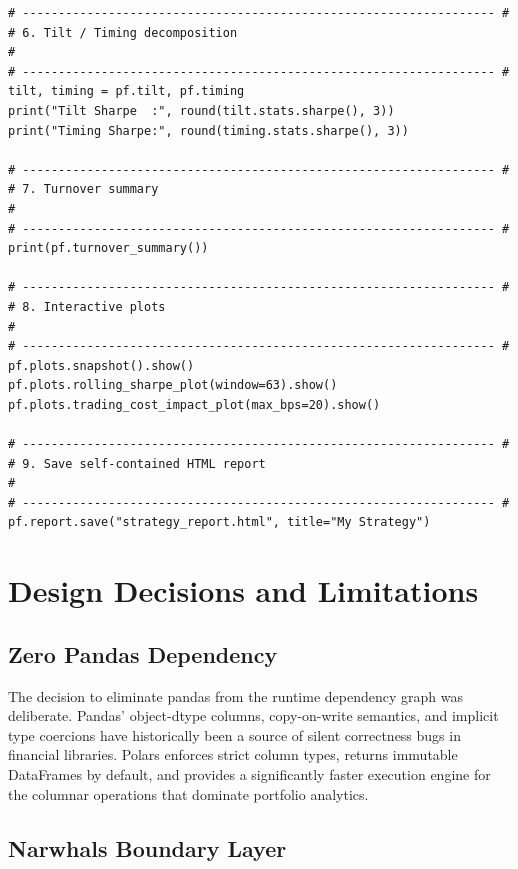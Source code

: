 \documentclass[11pt,a4paper]{article}
\begin{document}
\begin{lstlisting}[caption={Complete usage example.}]
# ------------------------------------------------------------------ #
# 6. Tilt / Timing decomposition                                      #
# ------------------------------------------------------------------ #
tilt, timing = pf.tilt, pf.timing
print("Tilt Sharpe  :", round(tilt.stats.sharpe(), 3))
print("Timing Sharpe:", round(timing.stats.sharpe(), 3))

# ------------------------------------------------------------------ #
# 7. Turnover summary                                                 #
# ------------------------------------------------------------------ #
print(pf.turnover_summary())

# ------------------------------------------------------------------ #
# 8. Interactive plots                                                #
# ------------------------------------------------------------------ #
pf.plots.snapshot().show()
pf.plots.rolling_sharpe_plot(window=63).show()
pf.plots.trading_cost_impact_plot(max_bps=20).show()

# ------------------------------------------------------------------ #
# 9. Save self-contained HTML report                                  #
# ------------------------------------------------------------------ #
pf.report.save("strategy_report.html", title="My Strategy")
\end{lstlisting}

\section{Design Decisions and Limitations}
\label{sec:design}

\subsection{Zero Pandas Dependency}

The decision to eliminate pandas from the runtime dependency graph was
deliberate.  Pandas' object-dtype columns, copy-on-write semantics, and
implicit type coercions have historically been a source of silent correctness
bugs in financial libraries.  Polars enforces strict column types, returns
immutable DataFrames by default, and provides a significantly faster execution
engine for the columnar operations that dominate portfolio analytics.

\subsection{Narwhals Boundary Layer}
\end{document}
